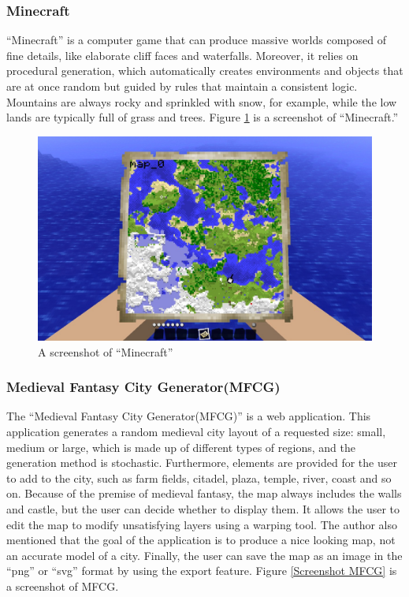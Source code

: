 \subsubsection{Minecraft}
``Minecraft'' is a computer game that can produce massive worlds composed of fine details, like elaborate cliff faces and waterfalls. Moreover, it relies on procedural generation, which automatically creates environments and objects that are at once random but guided by rules that maintain a consistent logic. Mountains are always rocky and sprinkled with snow, for example, while the low lands are typically full of grass and trees. Figure \ref{Screenshot Minecraft} is a screenshot of ``Minecraft.''

\begin{figure}[!htb]
\centering
\includegraphics[width=\textwidth]{section01/assets/screenshot_Minecraft.jpg}
\caption[A screenshot of ``Minecraft'']{\label{Screenshot Minecraft}A screenshot of ``Minecraft''}
\end{figure}

\subsubsection{Medieval Fantasy City Generator(MFCG)}
The ``Medieval Fantasy City Generator(MFCG)'' is a web application. This application generates a random medieval city layout of a requested size: small, medium or large, which is made up of different types of regions, and the generation method is stochastic. Furthermore, elements are provided for the user to add to the city, such as farm fields, citadel, plaza, temple, river, coast and so on. Because of the premise of medieval fantasy, the map always includes the walls and castle, but the user can decide whether to display them. It allows the user to edit the map to modify unsatisfying layers using a warping tool. The author also mentioned that the goal of the application is to produce a nice looking map, not an accurate model of a city. Finally, the user can save the map as an image in the ``png'' or ``svg'' format by using the export feature. Figure \ref{Screenshot MFCG} is a screenshot of MFCG.

